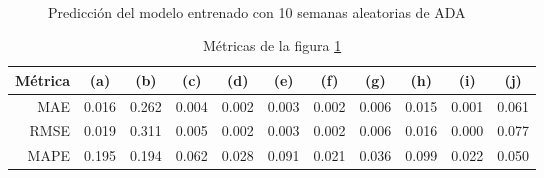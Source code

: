 \documentclass[a4paper,10pt]{article}
\begin{document}
\begin{figure}[h]
    \\
  \caption{Predicción del modelo entrenado con 10 semanas aleatorias de ADA}
  \label{f:ada_wk_arima}
\end{figure}

\begin{table}[h]
 \begin{center}
  \begin{tabular}{|r|c|c|c|c|c|c|c|c|c|c|}
    Métrica & (a) & (b) & (c) & (d) & (e) & (f) & (g) & (h) & (i) & (j) \\ \hline
    MAE & 0.016 & 0.262 & 0.004 & 0.002 & 0.003 & 0.002 & 0.006 & 0.015 & 0.001 & 0.061 \\
    RMSE & 0.019 & 0.311 & 0.005 & 0.002 & 0.003 & 0.002 & 0.006 & 0.016 & 0.000 & 0.077 \\
    MAPE & 0.195 & 0.194 & 0.062 & 0.028 & 0.091 & 0.021 & 0.036 & 0.099 & 0.022 & 0.050 \\ \hline
  \end{tabular}
  \caption{Métricas de la figura \ref{f:ada_wk_arima}}
  \label{tab:ada}
 \end{center}
\end{table}
\end{document}
